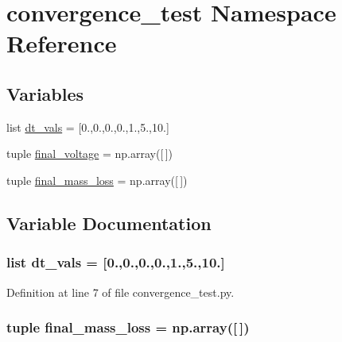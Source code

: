 \hypertarget{namespaceconvergence__test}{\section{convergence\-\_\-test Namespace Reference}
\label{namespaceconvergence__test}
}
\subsection*{Variables}
\begin{DoxyCompactItemize}
\item 
list \hyperlink{namespaceconvergence__test_a01bf350668845d335856a01897f52f08}{dt\-\_\-vals} = \mbox{[}0.,0.,0.,0.,1.,5.,10.\mbox{]}
\item 
tuple \hyperlink{namespaceconvergence__test_aec622a0e4663d49d3f8ceee22ccbdbcd}{final\-\_\-voltage} = np.\-array(\mbox{[}$\,$\mbox{]})
\item 
tuple \hyperlink{namespaceconvergence__test_a448aa99af90ec96ea31c5b766b2493e1}{final\-\_\-mass\-\_\-loss} = np.\-array(\mbox{[}$\,$\mbox{]})
\end{DoxyCompactItemize}


\subsection{Variable Documentation}
\hypertarget{namespaceconvergence__test_a01bf350668845d335856a01897f52f08}{
\subsubsection[{dt\-\_\-vals}]{\setlength{\rightskip}{0pt plus 5cm}list dt\-\_\-vals = \mbox{[}0.,0.,0.,0.,1.,5.,10.\mbox{]}}}\label{namespaceconvergence__test_a01bf350668845d335856a01897f52f08}


Definition at line 7 of file convergence\-\_\-test.\-py.

\hypertarget{namespaceconvergence__test_a448aa99af90ec96ea31c5b766b2493e1}{
\subsubsection[{final\-\_\-mass\-\_\-loss}]{\setlength{\rightskip}{0pt plus 5cm}tuple final\-\_\-mass\-\_\-loss = np.\-array(\mbox{[}$\,$\mbox{]})}}\label{namespaceconvergence__test_a448aa99af90ec96ea31c5b766b2493e1}


